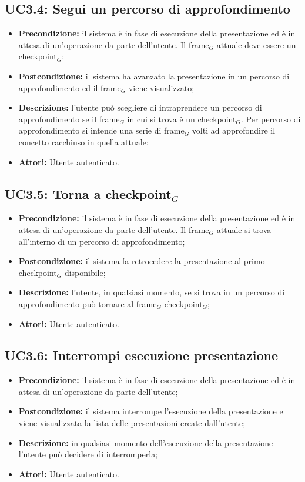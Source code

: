 \subsection{ UC3.4: Segui un percorso di approfondimento}

\begin{itemize}
	\item \textbf{Precondizione:} il sistema è in fase di esecuzione della presentazione ed è in attesa di un'operazione da parte dell'utente. Il frame$_G$ attuale deve essere un checkpoint$_G$;
	\item \textbf{Postcondizione:} il sistema ha avanzato la presentazione in un percorso di approfondimento ed il frame$_G$ viene visualizzato;
	\item \textbf{Descrizione:} l'utente può scegliere di intraprendere un percorso di approfondimento se il frame$_G$ in cui si trova è un checkpoint$_G$. Per percorso di approfondimento si intende una serie di frame$_G$ volti ad approfondire il concetto racchiuso in quella attuale;
	\item \textbf{Attori:} Utente autenticato.
\end{itemize}
\subsection{ UC3.5: Torna a checkpoint$_G$}

\begin{itemize}
	\item \textbf{Precondizione:} il sistema è in fase di esecuzione della presentazione ed è in attesa di un'operazione da parte dell'utente. Il frame$_G$ attuale si trova all'interno di un percorso di approfondimento;
	\item \textbf{Postcondizione:} il sistema fa retrocedere la presentazione al primo checkpoint$_G$ disponibile;
	\item \textbf{Descrizione:} l'utente, in qualsiasi momento, se si trova in un percorso di approfondimento può tornare al frame$_G$ checkpoint$_G$;
	\item \textbf{Attori:} Utente autenticato.
\end{itemize}
\subsection{ UC3.6: Interrompi esecuzione presentazione}

\begin{itemize}
	\item \textbf{Precondizione:} il sistema è in fase di esecuzione della presentazione ed è in attesa di un'operazione da parte dell'utente;
	\item \textbf{Postcondizione:} il sistema interrompe l'esecuzione della presentazione e viene visualizzata la lista delle presentazioni create dall'utente;
	\item \textbf{Descrizione:} in qualsiasi momento dell'esecuzione della presentazione l'utente può decidere di interromperla;
	\item \textbf{Attori:} Utente autenticato.
\end{itemize}
\clearpage
